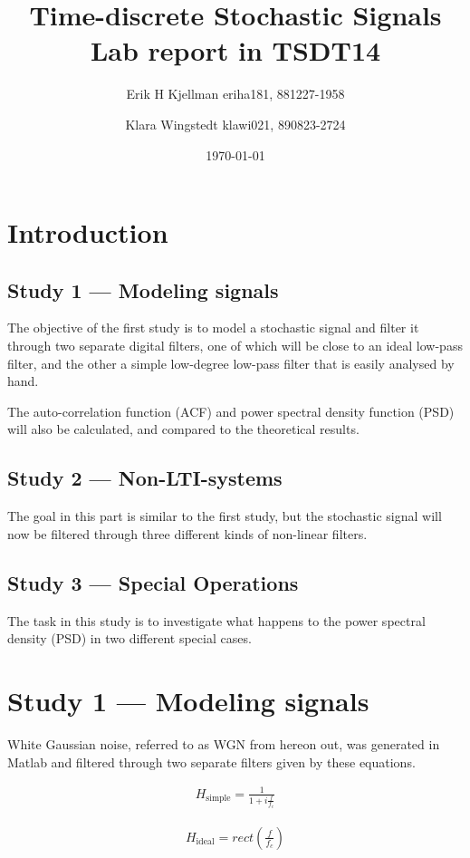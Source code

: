 \documentclass[10pt]{article}
\title{Time-discrete Stochastic Signals\\
Lab report in TSDT14}
\author{Erik H Kjellman eriha181, 881227-1958 \and
Klara Wingstedt klawi021, 890823-2724 }
\date{\today}
\begin{document}
\maketitle

\newpage

\section{Introduction}

\subsection{Study 1 --- Modeling signals}
The objective of the first study is to model a stochastic signal
and filter it through two separate digital filters, one of which will 
be close to an ideal low-pass filter, and the other a simple low-degree 
low-pass filter that is easily analysed by hand. 

The auto-correlation function (ACF) and power spectral density function (PSD) will also be calculated, and compared to the theoretical results. 

\subsection{Study 2 --- Non-LTI-systems}
The goal in this part is similar to the first study, but the stochastic signal will now be filtered through three different kinds of non-linear filters.

\subsection{Study 3 --- Special Operations}
The task in this study is to investigate what happens to the power spectral density (PSD) in two different special cases. 

\section{Study 1 --- Modeling signals}
White Gaussian noise, referred to as WGN from hereon out, was generated in Matlab and filtered through two separate filters given by these equations.

\begin{align*}
H_{\text{simple}} = \frac{1}{1 + i\frac{f}{f_c}}
\end{align*}

\begin{align*}
H_{\text{ideal}} = rect(\frac{f}{f_c})
\end{align*}
\end{document}
